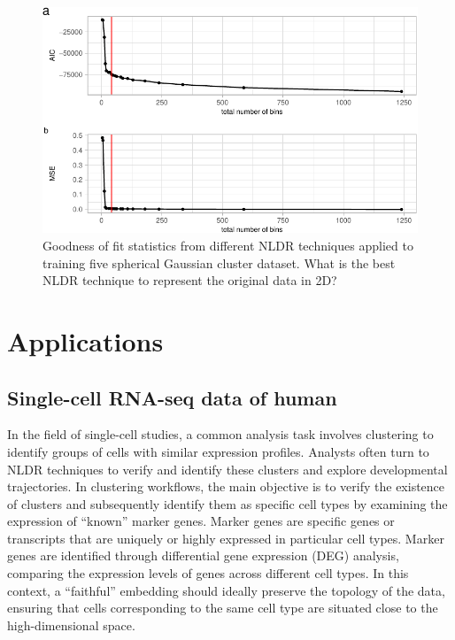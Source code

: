 \documentclass[
  12pt]{article}
\begin{document}
\begin{figure}

{\centering \includegraphics[width=1\textwidth,height=\textheight]{paper_files/figure-pdf/fig-diagnosticpltGau-1.pdf}

}

\caption{\label{fig-diagnosticpltGau}Goodness of fit statistics from
different NLDR techniques applied to training five spherical Gaussian
cluster dataset. What is the best NLDR technique to represent the
original data in 2D?}

\end{figure}

\hypertarget{sec-applications}{%
\section{Applications}\label{sec-applications}}

\hypertarget{single-cell-rna-seq-data-of-human}{%
\subsection{Single-cell RNA-seq data of
human}\label{single-cell-rna-seq-data-of-human}}

In the field of single-cell studies, a common analysis task involves
clustering to identify groups of cells with similar expression profiles.
Analysts often turn to NLDR techniques to verify and identify these
clusters and explore developmental trajectories. In clustering
workflows, the main objective is to verify the existence of clusters and
subsequently identify them as specific cell types by examining the
expression of ``known'' marker genes. Marker genes are specific genes or
transcripts that are uniquely or highly expressed in particular cell
types. Marker genes are identified through differential gene expression
(DEG) analysis, comparing the expression levels of genes across
different cell types. In this context, a ``faithful'' embedding should
ideally preserve the topology of the data, ensuring that cells
corresponding to the same cell type are situated close to the
high-dimensional space.
\end{document}
